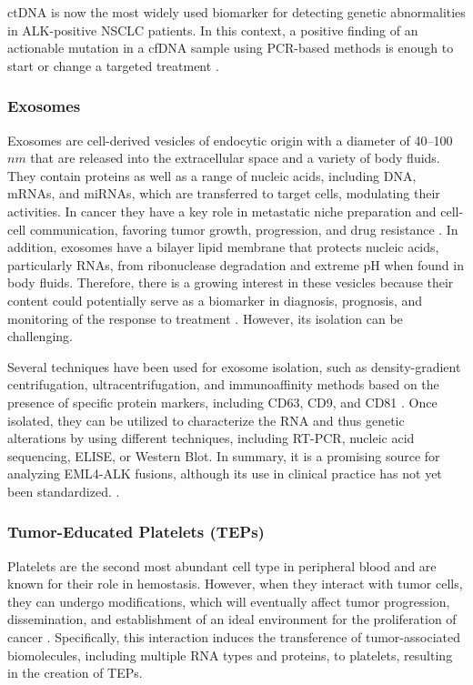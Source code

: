 ctDNA is now the most widely used biomarker for detecting genetic abnormalities in ALK-positive NSCLC patients. In this context, a positive finding of an actionable mutation in a cfDNA sample using PCR-based methods is enough to start or change a targeted treatment \cite{LB_NSCLC}.

\subsubsection{Exosomes}

Exosomes are cell-derived vesicles of endocytic origin with a diameter of 40–100 $nm$ that are released into the extracellular space and a variety of body fluids. They contain proteins as well as a range of nucleic acids, including DNA, mRNAs, and miRNAs, which are transferred to target cells, modulating their activities. In cancer they have a key role in metastatic niche preparation and cell-cell communication, favoring tumor growth, progression, and drug resistance \cite{Exosomes}. In addition, exosomes have a bilayer lipid membrane that protects nucleic acids, particularly RNAs, from ribonuclease degradation and extreme pH when found in body fluids. Therefore, there is a growing interest in these vesicles because their content could potentially serve as a biomarker in diagnosis, prognosis, and monitoring of the response to treatment \cite{LB_NSCLC, LB_atocha}. However, its isolation can be challenging.

Several techniques have been used for exosome isolation, such as density-gradient centrifugation, ultracentrifugation, and immunoaffinity methods based on the presence of specific protein markers, including CD63, CD9, and CD81 \cite{Exosomes}. Once isolated, they can be utilized to characterize the RNA and thus genetic alterations by using different techniques, including RT-PCR, nucleic acid sequencing, ELISE, or Western Blot. In summary, it is a promising source for analyzing EML4-ALK fusions, although its use in clinical practice has not yet been standardized. \cite{LB_atocha}.

\subsubsection{Tumor-Educated Platelets (TEPs)}

Platelets are the second most abundant cell type in peripheral blood and are known for their role in hemostasis. However, when they interact with tumor cells, they can undergo modifications, which will eventually affect tumor progression, dissemination, and establishment of an ideal environment for the proliferation of cancer \cite{Metastasis, Angiogenesis}. Specifically, this interaction induces the transference of tumor-associated biomolecules, including multiple RNA types and proteins, to platelets, resulting in the creation of TEPs.

